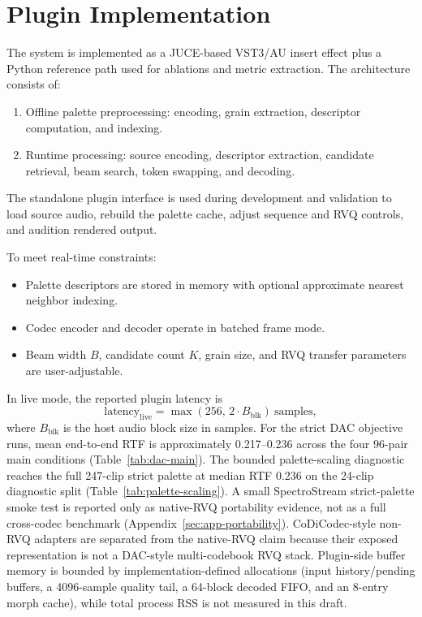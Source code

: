 \documentclass[twoside,a4paper]{article}
\begin{document}
\section{Plugin Implementation}\label{sec:implementation}

The system is implemented as a JUCE-based VST3/AU insert effect plus a Python reference path used for ablations and metric extraction. The architecture consists of:

\begin{enumerate}
    \item Offline palette preprocessing: encoding, grain extraction, descriptor computation, and indexing.
    \item Runtime processing: source encoding, descriptor extraction, candidate retrieval, beam search, token swapping, and decoding.
\end{enumerate}

The standalone plugin interface is used during development and validation to load source audio, rebuild the palette cache, adjust sequence and RVQ controls, and audition rendered output.

To meet real-time constraints:

\begin{itemize}
    \item Palette descriptors are stored in memory with optional approximate nearest neighbor indexing.
    \item Codec encoder and decoder operate in batched frame mode.
    \item Beam width $B$, candidate count $K$, grain size, and RVQ transfer parameters are user-adjustable.
\end{itemize}

In live mode, the reported plugin latency is
\begin{equation}
\text{latency}_{\mathrm{live}} = \max(256,\,2\cdot B_{\mathrm{blk}})\ \text{samples},
\end{equation}
where $B_{\mathrm{blk}}$ is the host audio block size in samples.
For the strict DAC objective runs, mean end-to-end RTF is approximately 0.217--0.236 across the four 96-pair main conditions (Table~\ref{tab:dac-main}). The bounded palette-scaling diagnostic reaches the full 247-clip strict palette at median RTF 0.236 on the 24-clip diagnostic split (Table~\ref{tab:palette-scaling}). A small SpectroStream strict-palette smoke test is reported only as native-RVQ portability evidence, not as a full cross-codec benchmark (Appendix~\ref{sec:app-portability}). CoDiCodec-style non-RVQ adapters are separated from the native-RVQ claim because their exposed representation is not a DAC-style multi-codebook RVQ stack. Plugin-side buffer memory is bounded by implementation-defined allocations (input history/pending buffers, a 4096-sample quality tail, a 64-block decoded FIFO, and an 8-entry morph cache), while total process RSS is not measured in this draft.
\end{document}
